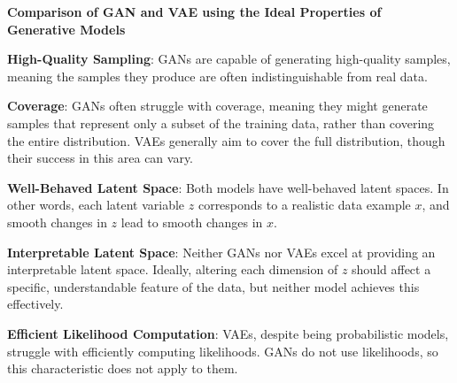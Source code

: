 \textbf{Comparison of GAN and VAE using the Ideal Properties of Generative Models}

\textbf{High-Quality Sampling}: GANs are capable of generating high-quality samples, meaning the samples they produce are often indistinguishable from real data.

\textbf{Coverage}: GANs often struggle with coverage, meaning they might generate samples that represent only a subset of the training data, rather than covering the entire distribution. VAEs generally aim to cover the full distribution, though their success in this area can vary.

\textbf{Well-Behaved Latent Space}: Both models have well-behaved latent spaces. In other words, each latent variable $z$ corresponds to a realistic data example $x$, and smooth changes in $z$ lead to smooth changes in $x$.

\textbf{Interpretable Latent Space}: Neither GANs nor VAEs excel at providing an interpretable latent space. Ideally, altering each dimension of $z$ should affect a specific, understandable feature of the data, but neither model achieves this effectively.

\textbf{Efficient Likelihood Computation}: VAEs, despite being probabilistic models, struggle with efficiently computing likelihoods. GANs do not use likelihoods, so this characteristic does not apply to them.

